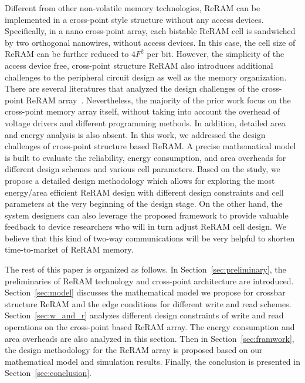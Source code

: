 Different from other non-volatile memory technologies, ReRAM can be implemented in a cross-point style structure without any access devices. Specifically, in a nano cross-point array, each bistable ReRAM cell is sandwiched by two orthogonal nanowires, without access devices. In this case, the cell size of ReRAM can be further reduced to $4F^2$ per bit. However, the simplicity of the access device free, cross-point structure ReRAM also introduces additional challenges to the peripheral circuit design as well as the memory organization. There are several literatures that analyzed the design challenges of the cross-point ReRAM array~\cite{crossbar_NANO2002_Ziegler,crossbar_NANO08_Flocke,crossbar_TED_2010,crossbar_NANO2003_Ziegler}. Nevertheless, the majority of the prior work focus on the cross-point memory array itself,  without taking into account the overhead of voltage drivers and different programming methods. In addition, detailed area and energy analysis is also absent. In this work, we addressed the design challenges of cross-point structure based ReRAM. A precise mathematical model is built to evaluate the reliability, energy consumption, and area overheads for different design schemes and various cell parameters. Based on the study, we propose a detailed design methodology which allows for exploring the most energy/area efficient ReRAM design with different design constraints and cell parameters at the very beginning of the design stage. On the other hand, the system designers can also leverage the proposed framework to provide valuable feedback to device researchers who will in turn adjust ReRAM cell design. We believe that this kind of two-way communications will be very helpful to shorten time-to-market of ReRAM memory.

The rest of this paper is organized as follows. In
Section~\ref{sec:preliminary}, the preliminaries of ReRAM technology and cross-point architecture are introduced. Section~\ref{sec:model} discusses the mathematical model we propose for crossbar structure ReRAM and the edge conditions for different write and read schemes. Section~\ref{sec:w_and_r} analyzes different design constraints of write and read operations on the cross-point based ReRAM array. The energy consumption and area overheads are also analyzed in this section. Then in Section~\ref{sec:framwork}, the design methodology for the ReRAM array is proposed based on our mathematical model and simulation results. Finally, the conclusion is presented in Section~\ref{sec:conclusion}. 